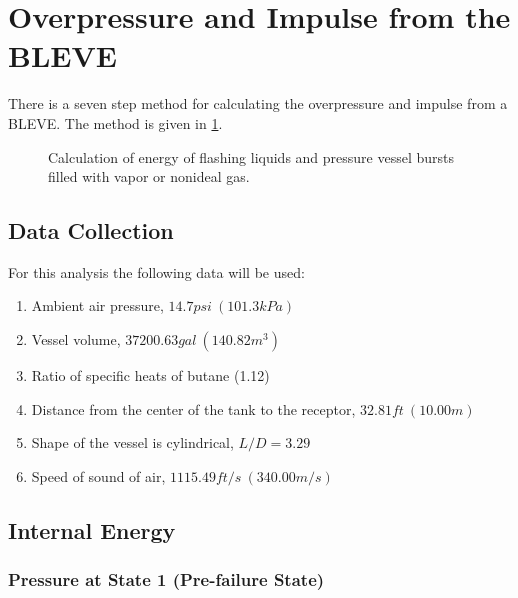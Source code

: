 \documentclass[10pt,parskip=half,
toc=sectionentrywithdots,
bibliography=totocnumbered,
captions=tableheading,numbers=noendperiod]{scrartcl}
\providecommand{\tightlist}{%
  \setlength{\itemsep}{0pt}\setlength{\parskip}{0pt}}
\begin{document}
\hypertarget{overpressure-and-impulse-from-the-bleve}{%
\section{Overpressure and Impulse from the
BLEVE}\label{overpressure-and-impulse-from-the-bleve}}

There is a seven step method for calculating the overpressure and
impulse from a BLEVE. The method is given in
\cref{fig:fig_bleve_process}.

\begin{figure}[H]
\hypertarget{fig:fig_bleve_process}{%
\begin{center}
\end{center}
\caption{Calculation of energy of flashing liquids and pressure vessel bursts
filled with vapor or nonideal gas. \cite{Safety2010}}\label{fig:fig_bleve_process}
}
\end{figure}

\hypertarget{data-collection}{%
\subsection{Data Collection}\label{data-collection}}

For this analysis the following data will be used:

\begin{enumerate}
\def\labelenumi{\arabic{enumi}.}
\tightlist
\item
  Ambient air pressure, \(14.7psi\:(101.3kPa)\)
\item
  Vessel volume, \(37200.63gal\:(140.82m^3)\)
\item
  Ratio of specific heats of butane (1.12)
\item
  Distance from the center of the tank to the receptor,
  \(32.81ft\:(10.00m)\)
\item
  Shape of the vessel is cylindrical, \(L/D=3.29\)
\item
  Speed of sound of air, \(1115.49ft/s\:(340.00m/s)\)
\end{enumerate}

\hypertarget{internal-energy}{%
\subsection{Internal Energy}\label{internal-energy}}

\hypertarget{pressure-at-state-1-pre-failure-state}{%
\subsubsection{Pressure at State 1 (Pre-failure
State)}\label{pressure-at-state-1-pre-failure-state}}
\end{document}
